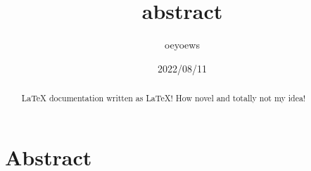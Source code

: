 \documentclass[UTF8]{article}
\title{abstract}
\author{oeyoews}
\date{2022/08/11}
\begin{document}
\maketitle

\section{ Abstract}%
\label{sec:Abstract}

\begin{abstract}
	\LaTeX{} documentation written as \LaTeX! How novel and totally not
	my idea!
\end{abstract}
\end{document}
